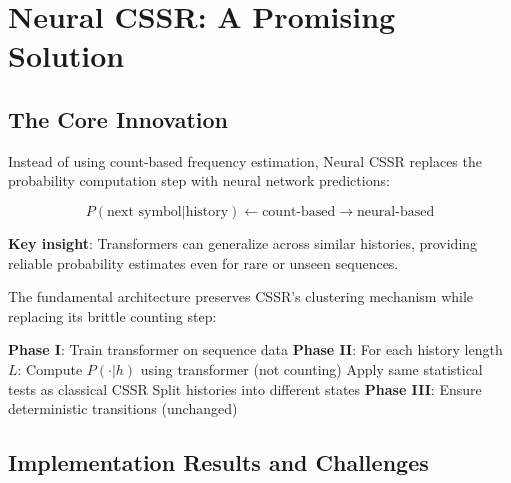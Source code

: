 \documentclass[11pt]{article}
\begin{document}
\section{Neural CSSR: A Promising Solution}

\subsection{The Core Innovation}

\begin{notebox}
Instead of using count-based frequency estimation, Neural CSSR replaces the probability computation step with neural network predictions:

$$P(\text{next symbol} | \text{history}) \leftarrow \text{count-based} \rightarrow \text{neural-based}$$

\textbf{Key insight}: Transformers can generalize across similar histories, providing reliable probability estimates even for rare or unseen sequences.
\end{notebox}

The fundamental architecture preserves CSSR's clustering mechanism while replacing its brittle counting step:

\begin{codebox}
\begin{algorithmic}
\STATE \textbf{Phase I}: Train transformer on sequence data
\STATE \textbf{Phase II}: For each history length $L$:
    \STATE Compute $P(\cdot|h)$ using transformer (not counting)
    \STATE Apply same statistical tests as classical CSSR
        \STATE Split histories into different states
    \ENDIF
\ENDFOR
\STATE \textbf{Phase III}: Ensure deterministic transitions (unchanged)
\end{algorithmic}
\end{codebox}

\subsection{Implementation Results and Challenges}
\end{document}
